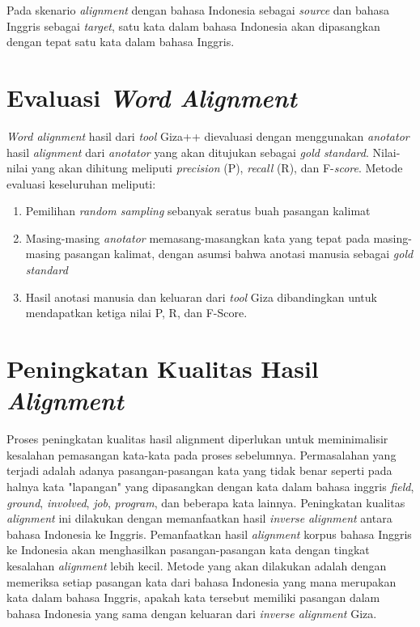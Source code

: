 Pada skenario \textit{alignment} dengan bahasa Indonesia sebagai \textit{source} dan bahasa Inggris sebagai \textit{target}, satu kata dalam bahasa Indonesia akan dipasangkan dengan tepat satu kata dalam bahasa Inggris.

\section{Evaluasi \textit{Word Alignment}} \label{sec:pembentukanTdanH}
\textit{Word alignment} hasil dari \textit{tool} Giza++ dievaluasi dengan menggunakan \textit{anotator} hasil \textit{alignment} dari \textit{anotator} yang akan ditujukan sebagai \textit{gold standard}. Nilai-nilai yang akan dihitung meliputi \textit{precision} (P), \textit{recall} (R), dan F-\textit{score}. Metode evaluasi keseluruhan meliputi:

\begin{enumerate}
	\item Pemilihan \textit{random sampling} sebanyak seratus buah pasangan kalimat
	\item Masing-masing \textit{anotator} memasang-masangkan kata yang tepat pada masing-masing pasangan kalimat, dengan asumsi bahwa anotasi manusia sebagai \textit{gold standard}
	\item Hasil anotasi manusia dan keluaran dari \textit{tool} Giza dibandingkan untuk mendapatkan ketiga nilai P, R, dan F-Score.
\end{enumerate}


\section{Peningkatan Kualitas Hasil \textit{Alignment}}
Proses peningkatan kualitas hasil alignment diperlukan untuk meminimalisir kesalahan pemasangan kata-kata pada proses sebelumnya. Permasalahan  yang terjadi adalah adanya pasangan-pasangan kata yang tidak benar seperti pada halnya kata "lapangan" yang  dipasangkan dengan kata dalam bahasa inggris \textit{field}, \textit{ground}, \textit{involved}, \textit{job}, \textit{program}, dan beberapa kata lainnya. Peningkatan kualitas \textit{alignment} ini dilakukan dengan memanfaatkan hasil \textit{inverse} \textit{alignment} antara bahasa Indonesia ke Inggris. Pemanfaatkan hasil \textit{alignment} korpus bahasa Inggris ke Indonesia akan menghasilkan pasangan-pasangan kata dengan tingkat kesalahan \textit{alignment} lebih kecil. Metode yang akan dilakukan adalah dengan memeriksa setiap pasangan kata dari bahasa Indonesia yang mana merupakan kata dalam bahasa Inggris, apakah kata tersebut memiliki pasangan dalam bahasa Indonesia yang sama dengan keluaran dari \textit{inverse alignment} Giza.

